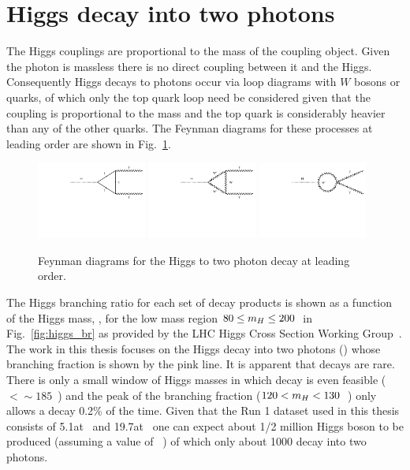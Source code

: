 \section{Higgs decay into two photons}

The Higgs couplings are proportional to the mass of the coupling object. Given the photon is massless there is no direct coupling between it and the Higgs. Consequently Higgs decays to photons occur via loop diagrams with $W$ bosons or quarks, of which only the top quark loop need be considered given that the coupling is proportional to the mass and the top quark is considerably heavier than any of the other quarks. The Feynman diagrams for these processes at leading order are shown in Fig.~\ref{fig:feyn_hgg_decay}.

\begin{figure}
  \includegraphics[width=0.32\textwidth]{theory/plots/Htgg.pdf}
  \includegraphics[width=0.32\textwidth]{theory/plots/HWgg.pdf}
  \includegraphics[width=0.32\textwidth]{theory/plots/HWgg4.pdf}
  \caption{Feynman diagrams for the \SM Higgs to two photon decay at leading order.}
  \label{fig:feyn_hgg_decay}
\end{figure}


The \SM Higgs branching ratio for each set of decay products is shown as a function of the Higgs mass, \mH, for the low mass region $80\leq m_{H}\leq 200$~\GeV in Fig.~\ref{fig:higgs_br} as provided by the LHC Higgs Cross Section Working Group~\cite{LHCHiggsCrossSectionWorkingGroup3}. The work in this thesis focuses on the Higgs decay into two photons (\Hgg) whose branching fraction is shown by the pink line. It is apparent that \Hgg decays are rare. There is only a small window of Higgs masses in which \Hgg decay is even feasible (\mH$<\sim185$~\GeV) and the peak of the branching fraction ($120<m_{H}<130$~\GeV) only allows a \SM \Hgg decay 0.2\% of the time. Given that the \LHC Run 1 dataset used in this thesis consists of 5.1\fbinv at ~\TeV and 19.7\fbinv at ~\TeV one can expect about 1/2 million \SM Higgs boson to be produced (assuming a value of ~\GeV) of which only about 1000 decay into two photons. 

